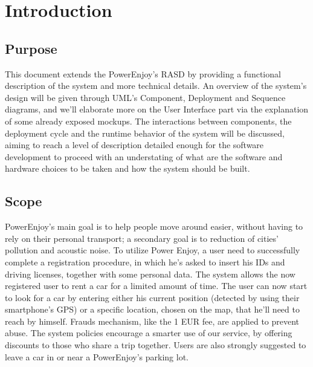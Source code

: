\documentclass[a4paper,12pt,oneside]{report}
\newlength{\defbaselineskip}
\newcommand{\setlinespacing}[1]%
           {\setlength{\baselineskip}{#1 \defbaselineskip}}
\begin{document}


\clearpage
\newpage


\setlinespacing{1.5}




\tableofcontents
\newpage
\clearpage




\pagestyle{fancy} 
\headsep=40pt 
\lhead{} 
\rhead{\slshape \leftmark} 
\cfoot{\thepage}






\renewcommand\thesection{\Alph{section}}


\chapter{Introduction}
\section{Purpose}
This document extends the PowerEnjoy's RASD by providing a functional description of the system and more technical details.
An overview of the system's design will be given through UML's Component, Deployment and Sequence diagrams, and we'll elaborate more on the User Interface part  via the explanation of some already exposed mockups.
The interactions between components, the deployment cycle and the runtime behavior of the system will be discussed, aiming to reach a level of description detailed enough for the software development to proceed with an understating of what are the software and hardware choices to be taken and how the system should be built.
\newpage
\section{Scope}
PowerEnjoy's main goal is to help people move around easier, without having to rely on their personal transport; a secondary goal is to reduction of cities' pollution and acoustic noise.
To utilize Power Enjoy, a user need to successfully complete a registration procedure, in which he's asked to insert his IDs and driving licenses, together with some personal data.
The system allows the now registered user to rent a car for a limited amount of time.
The user can now start to look for a car by entering either his current position (detected by using their smartphone's GPS) or a specific location, chosen on the map, that he'll need to reach by himself.
Frauds mechanism, like the 1 EUR fee, are applied to prevent abuse.
The system policies encourage a smarter use of our service, by offering discounts to those who share a trip together. 
Users are also strongly suggested to leave a car in or near a PowerEnjoy's parking lot.
\newpage
\end{document}
